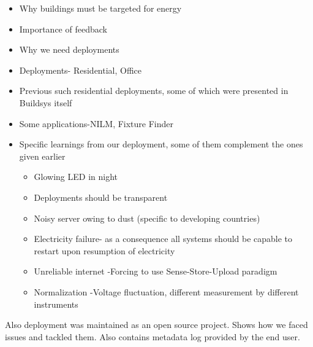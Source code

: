\documentclass[10pt]{sensys-proc}
\begin{document}
\begin{itemize}
\item Why buildings must be targeted for energy \cite{evans09}
\item Importance of feedback \cite{darby}
\item Why we need deployments
\item Deployments- Residential, Office \cite{yuvraj_ipsn, batra}
\item Previous such residential deployments, some of which were presented in Buildsys itself \cite{hitchhiker_residential,hitchhiker_wsn,scale_wsn}
\item Some applications-NILM\cite{hart,survey1}, Fixture Finder \cite{fixturefinder}
\item Specific learnings from our deployment, some of them complement the ones given earlier \cite{hitchhiker_residential}
\begin{itemize}
\item Glowing LED in night 
\item Deployments should be transparent
\item Noisy server owing to dust (specific to developing countries)
\item Electricity failure- as a consequence all systems should be capable to restart upon resumption of electricity
\item Unreliable internet -Forcing to use Sense-Store-Upload paradigm
\item Normalization -Voltage fluctuation, different measurement by different instruments


\end{itemize}
\end{itemize}
Also deployment was maintained as an open source project. Shows how we faced issues and tackled them. Also contains metadata log provided by the end user.
\end{document}
